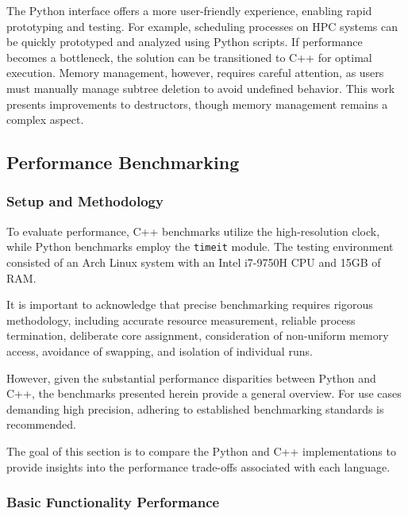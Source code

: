 The Python interface offers a more user-friendly experience, enabling rapid prototyping and testing. For example, scheduling processes on HPC systems can be quickly prototyped and analyzed using Python scripts. If performance becomes a bottleneck, the solution can be transitioned to C++ for optimal execution. Memory management, however, requires careful attention, as users must manually manage subtree deletion to avoid undefined behavior. This work presents improvements to destructors, though memory management remains a complex aspect.

\subsection{Performance Benchmarking}

\subsubsection{Setup and Methodology}

To evaluate performance, C++ benchmarks utilize the high-resolution clock, while Python benchmarks employ the \texttt{timeit} module. The testing environment consisted of an Arch Linux system with an Intel i7-9750H CPU and 15GB of RAM.

It is important to acknowledge that precise benchmarking requires rigorous methodology, including accurate resource measurement, reliable process termination, deliberate core assignment, consideration of non-uniform memory access, avoidance of swapping, and isolation of individual runs. \cite{beyer2019reliable}

However, given the substantial performance disparities between Python and C++, the benchmarks presented herein provide a general overview. For use cases demanding high precision, adhering to established benchmarking standards is recommended.

The goal of this section is to compare the Python and C++ implementations to provide insights into the performance trade-offs associated with each language.

\subsubsection{Basic Functionality Performance}

